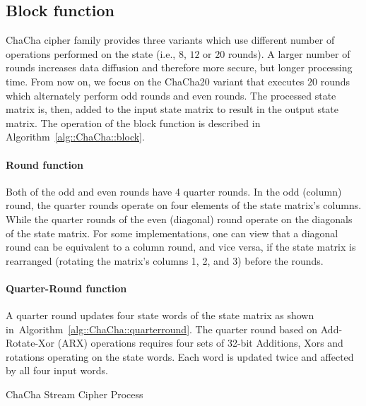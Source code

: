 \subsection{Block function}
ChaCha cipher family provides three variants which use different number
of operations performed on the state (i.e., $8$, $12$ or $20$ rounds). 
A larger number of rounds increases data diffusion and therefore more secure, but longer processing time. 
From now on, we focus on the ChaCha20 variant that executes $20$ rounds which alternately perform odd rounds and even rounds. The processed state matrix is, then, added to the input state matrix to result in the output state matrix. The operation of the block function is described in Algorithm~\ref{alg::ChaCha::block}.

\paragraph{Round function} Both of the odd and even rounds have 4 quarter rounds.
In the odd (column) round, the quarter rounds operate on four elements of the state matrix's columns.
While the quarter rounds of the even (diagonal) round operate on the diagonals of the state matrix.
For some implementations, one can view that a diagonal round can be equivalent to a column round, and vice versa, if the state matrix is rearranged (rotating the matrix's columns 1, 2, and 3) before the rounds. 

\paragraph{Quarter-Round function} A quarter round updates four state words of the state matrix as shown in~Algorithm~\ref{alg::ChaCha::quarterround}. 
The quarter round based on Add-Rotate-Xor (ARX) operations requires four sets of 32-bit Additions, Xors and  rotations operating on the state words. 
Each word is updated twice and affected by all four input words.

\begin{algorithm}
	\BlankLine
	\caption{ChaCha Stream Cipher Process}
	\label{alg::ChaCha::process}
\end{algorithm}

